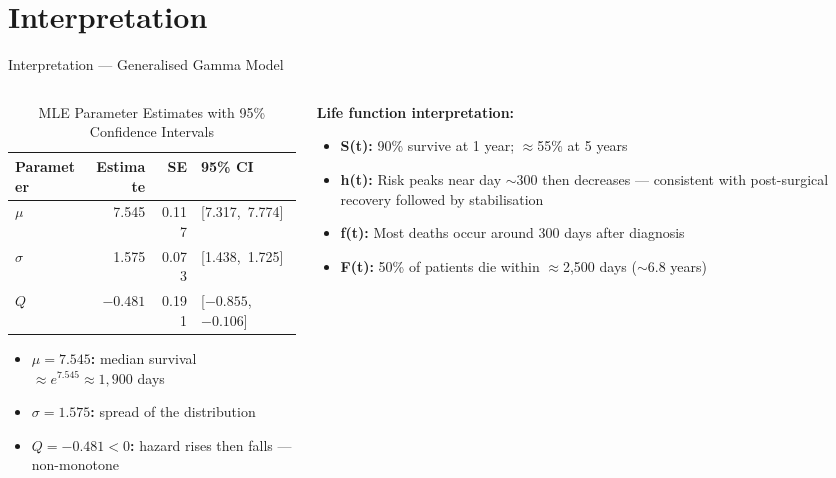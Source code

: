 \documentclass[aspectratio=169, 11pt]{beamer}
\begin{document}
\section{Interpretation}
\begin{frame}{Interpretation --- Generalised Gamma Model}

\begin{columns}[T]

  \begin{column}{0.46\textwidth}
    \vspace{4pt}
    \begin{table}
      \caption{MLE Parameter Estimates with 95\% Confidence Intervals}
      \small
      \begin{tabular}{@{}lrrl@{}}
        \toprule
        \textbf{Parameter} & \textbf{Estimate} & \textbf{SE} & \textbf{95\% CI} \\
        \midrule
        $\mu$      & 7.545    & 0.117 & {[}7.317,\ 7.774{]} \\
        $\sigma$   & 1.575    & 0.073 & {[}1.438,\ 1.725{]} \\
        $Q$        & $-0.481$ & 0.191 & {[}$-0.855$,\ $-0.106${]} \\
        \bottomrule
      \end{tabular}
    \end{table}

    \vspace{8pt}
    \small
    \begin{itemize}
      \item \textbf{$\mu = 7.545$:} median survival
            $\approx e^{7.545} \approx 1{,}900$ days
      \item \textbf{$\sigma = 1.575$:} spread of the distribution
      \item \textbf{$Q = -0.481 < 0$:} hazard
            \alert{rises then falls} --- non-monotone
    \end{itemize}
  \end{column}

  \begin{column}{0.50\textwidth}
    \vspace{14pt}
    \small
    \textbf{Life function interpretation:}
    \begin{itemize}
      \item \textbf{S(t):} 90\% survive at 1 year;
            $\approx$55\% at 5 years
      \item \textbf{h(t):} Risk peaks near day $\sim$300 then
            \alert{decreases} --- consistent with post-surgical
            recovery followed by stabilisation
      \item \textbf{f(t):} Most deaths occur around 300 days
            after diagnosis
      \item \textbf{F(t):} 50\% of patients die within
            $\approx$2{,}500 days ($\sim$6.8 years)
    \end{itemize}


\end{column}
\end{columns}
\end{frame}
\end{document}
